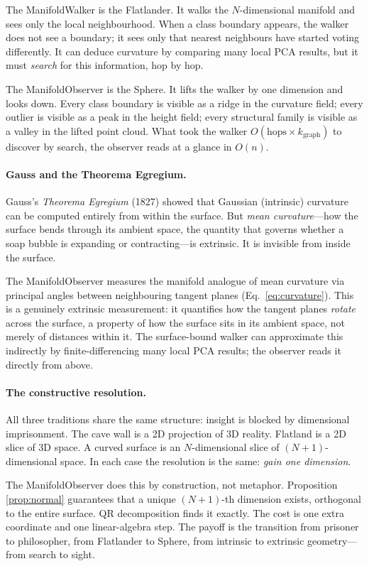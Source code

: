 \documentclass[12pt,letterpaper]{article}
\begin{document}
The ManifoldWalker is the Flatlander.  It walks the $N$-dimensional manifold and
sees only the local neighbourhood.  When a class boundary appears, the walker
does not see a boundary; it sees only that nearest neighbours have started voting
differently.  It can deduce curvature by comparing many local PCA results, but
it must \emph{search} for this information, hop by hop.

The ManifoldObserver is the Sphere.  It lifts the walker by one dimension and
looks down.  Every class boundary is visible as a ridge in the curvature field;
every outlier is visible as a peak in the height field; every structural family
is visible as a valley in the lifted point cloud.  What took the walker
$O(\text{hops} \times k_\text{graph})$ to discover by search, the observer reads
at a glance in $O(n)$.

\paragraph{Gauss and the Theorema Egregium.}
Gauss's \emph{Theorema Egregium} (1827) showed that Gaussian (intrinsic)
curvature can be computed entirely from within the surface.  But \emph{mean
curvature}---how the surface bends through its ambient space, the quantity that
governs whether a soap bubble is expanding or contracting---is extrinsic.  It is
invisible from inside the surface.

The ManifoldObserver measures the manifold analogue of mean curvature via
principal angles between neighbouring tangent planes (Eq.~\ref{eq:curvature}).
This is a genuinely extrinsic measurement: it quantifies how the tangent planes
\emph{rotate} across the surface, a property of how the surface sits in its
ambient space, not merely of distances within it.  The surface-bound walker can
approximate this indirectly by finite-differencing many local PCA results; the
observer reads it directly from above.

\paragraph{The constructive resolution.}
All three traditions share the same structure: insight is blocked by dimensional
imprisonment.  The cave wall is a 2D projection of 3D reality.  Flatland is a 2D
slice of 3D space.  A curved surface is an $N$-dimensional slice of
$(N{+}1)$-dimensional space.  In each case the resolution is the same: \emph{gain
one dimension}.

The ManifoldObserver does this by construction, not metaphor.  Proposition
\ref{prop:normal} guarantees that a unique $(N{+}1)$-th dimension exists,
orthogonal to the entire surface.  QR decomposition finds it exactly.  The cost
is one extra coordinate and one linear-algebra step.  The payoff is the
transition from prisoner to philosopher, from Flatlander to Sphere, from
intrinsic to extrinsic geometry---from search to sight.
\end{document}
